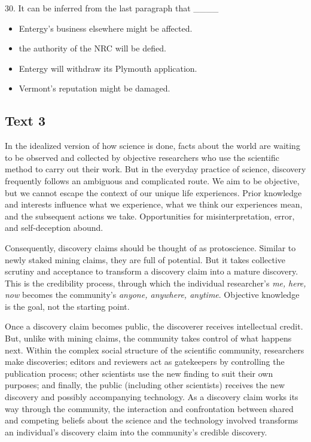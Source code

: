 \documentclass[UTF8,11pt]{ctexart}
\begin{document}
30. It can be inferred from the last paragraph that \_\_\_\_


\begin{itemize}[leftmargin=2em,itemsep=.2em,topsep=.4em]\item[A.] Entergy’s business elsewhere might be affected.
\item[B.] the authority of the NRC will be defied.
\item[C.] Entergy will withdraw its Plymouth application.
\item[D.] Vermont’s reputation might be damaged.
\end{itemize}

\subsection*{\textbf{Text 3}}


In the idealized version of how science is done, facts about the world are waiting to be observed and collected by objective researchers who use the scientific method to carry out their work. But in the everyday practice of science, discovery frequently follows an ambiguous and complicated route. We aim to be objective, but we cannot escape the context of our unique life experiences. Prior knowledge and interests influence what we experience, what we think our experiences mean, and the subsequent actions we take. Opportunities for misinterpretation, error, and self-deception abound.


Consequently, discovery claims should be thought of as protoscience. Similar to newly staked mining claims, they are full of potential. But it takes collective scrutiny and acceptance to transform a discovery claim into a mature discovery. This is the credibility process, through which the individual researcher’s \textit{me,} \textit{here,} \textit{now} becomes the community’s \textit{anyone, anywhere, anytime}. Objective knowledge is the goal, not the starting point.


Once a discovery claim becomes public, the discoverer receives intellectual credit. But, unlike with mining claims, the community takes control of what happens next. Within the complex social structure of the scientific community, researchers make discoveries; editors and reviewers act as gatekeepers by controlling the publication process; other scientists use the new finding to suit their own purposes; and finally, the public (including other scientists) receives the new discovery and possibly accompanying technology. As a discovery claim works its way through the community, the interaction and confrontation between shared and competing beliefs about the science and the technology involved transforms an individual’s discovery claim into the community’s credible discovery.
\end{document}
